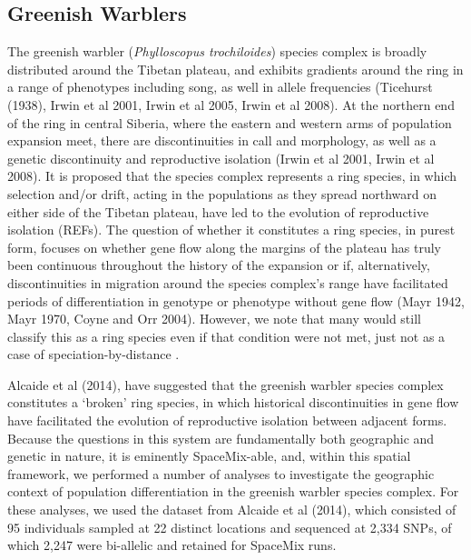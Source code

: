 \documentclass[12pt]{article}
\begin{document}
\subsection*{Greenish Warblers}  
The greenish warbler (\emph{Phylloscopus trochiloides}) species complex is broadly distributed around the Tibetan plateau, and exhibits gradients around the ring in a range of phenotypes including song, as well in allele frequencies (Ticehurst (1938), Irwin et al 2001, Irwin et al 2005, Irwin et al 2008).  At the northern end of the ring in central Siberia, where the eastern and western arms of population expansion meet, there are discontinuities in call and morphology, as well as a genetic discontinuity and reproductive isolation (Irwin et al 2001, Irwin et al 2008). It is proposed that the species complex represents a ring species, in which selection and/or drift, acting in the populations as they spread northward on either side of the Tibetan plateau, have led to the evolution of reproductive isolation (REFs).  The question of whether it constitutes a ring species, in purest form, focuses on whether gene flow along the margins of the plateau has truly been continuous throughout the history of the expansion or if, alternatively, discontinuities in migration around the species complex's range have facilitated periods of differentiation in genotype or phenotype without gene flow (Mayr 1942, Mayr 1970, Coyne and Orr 2004).  However, we note that many would still classify this as a ring species even if that condition were not met, just not as a case of speciation-by-distance \citep[see][ for discussion]{}.

Alcaide et al (2014), have suggested that the greenish warbler species complex constitutes a `broken' ring species, in which historical discontinuities in gene flow have facilitated the evolution of reproductive isolation between adjacent forms.  Because the questions in this system are fundamentally both geographic and genetic in nature, it is eminently SpaceMix-able, and, within this spatial framework, we performed a number of analyses to investigate the geographic context of population differentiation in the greenish warbler species complex. For these analyses, we used the dataset from Alcaide et al (2014), which consisted of 95 individuals sampled at 22 distinct locations and sequenced at 2,334 SNPs, of which 2,247 were bi-allelic and retained for SpaceMix runs.
\end{document}
